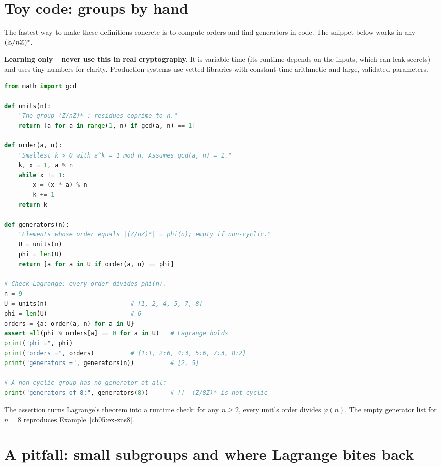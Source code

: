 \section{Toy code: groups by hand}
\label{ch05:code}

The fastest way to make these definitions concrete is to compute orders and find
generators in code. The snippet below works in any $(\mathbb{Z}/n\mathbb{Z})^{*}$.

\begin{implementbox}
\textbf{Learning only---never use this in real cryptography.} It is variable-time (its runtime depends on the inputs, which can leak secrets)
and uses tiny numbers for clarity. Production systems use vetted libraries with constant-time arithmetic and
large, validated parameters.
\begin{lstlisting}[language=Python]
from math import gcd

def units(n):
    "The group (Z/nZ)* : residues coprime to n."
    return [a for a in range(1, n) if gcd(a, n) == 1]

def order(a, n):
    "Smallest k > 0 with a^k = 1 mod n. Assumes gcd(a, n) = 1."
    k, x = 1, a % n
    while x != 1:
        x = (x * a) % n
        k += 1
    return k

def generators(n):
    "Elements whose order equals |(Z/nZ)*| = phi(n); empty if non-cyclic."
    U = units(n)
    phi = len(U)
    return [a for a in U if order(a, n) == phi]

# Check Lagrange: every order divides phi(n).
n = 9
U = units(n)                       # [1, 2, 4, 5, 7, 8]
phi = len(U)                       # 6
orders = {a: order(a, n) for a in U}
assert all(phi % orders[a] == 0 for a in U)   # Lagrange holds
print("phi =", phi)
print("orders =", orders)          # {1:1, 2:6, 4:3, 5:6, 7:3, 8:2}
print("generators =", generators(n))          # [2, 5]

# A non-cyclic group has no generator at all:
print("generators of 8:", generators(8))      # []  (Z/8Z)* is not cyclic
\end{lstlisting}
The assertion turns Lagrange's theorem into a runtime check: for any $n \ge 2$,
every unit's order divides $\varphi(n)$. The empty generator list for $n=8$
reproduces Example~\ref{ch05:ex-zns8}.
\end{implementbox}

\section{A pitfall: small subgroups and where Lagrange bites back}
\label{ch05:pitfall}

